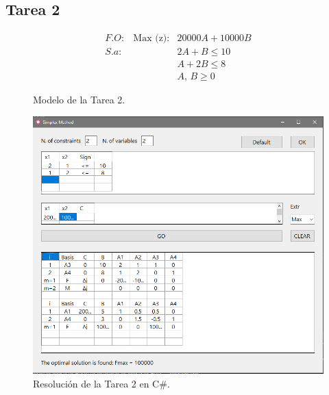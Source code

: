 \documentclass[a4paper, 12pt]{article}
\begin{document}
    \subsection{Tarea 2}
    \begin{figure}[H]
        \[\begin{matrix}
            F\!.\!O:&\text{Max (z)}:&20000A+10000B\\
            S.\!a: &&2A+B\leq 10\\
            &&A+2B\leq 8\\
            &&A,\, B\geq 0
        \end{matrix}\]
        \caption{Modelo de la Tarea 2.}
    \end{figure}
    \begin{figure}[H]
        \centering
        \includegraphics[width=12cm]{tarea2.PNG}
        \caption{Resolución de la Tarea 2 en C\#.}
    \end{figure}
    
    \newpage
\end{document}
